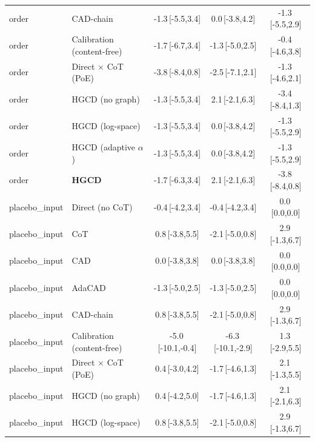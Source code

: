 \begin{tabular}{llccc}
order & CAD-chain & -1.3\,{\scriptsize[-5.5,3.4]} & 0.0\,{\scriptsize[-3.8,4.2]} & -1.3\,{\scriptsize[-5.5,2.9]} \\
order & Calibration (content-free) & -1.7\,{\scriptsize[-6.7,3.4]} & -1.3\,{\scriptsize[-5.0,2.5]} & -0.4\,{\scriptsize[-4.6,3.8]} \\
order & Direct $\times$ CoT (PoE) & -3.8\,{\scriptsize[-8.4,0.8]} & -2.5\,{\scriptsize[-7.1,2.1]} & -1.3\,{\scriptsize[-4.6,2.1]} \\
order & HGCD (no graph) & -1.3\,{\scriptsize[-5.5,3.4]} & 2.1\,{\scriptsize[-2.1,6.3]} & -3.4\,{\scriptsize[-8.4,1.3]} \\
order & HGCD (log-space) & -1.3\,{\scriptsize[-5.5,3.4]} & 0.0\,{\scriptsize[-3.8,4.2]} & -1.3\,{\scriptsize[-5.5,2.9]} \\
order & HGCD (adaptive $\alpha$) & -1.3\,{\scriptsize[-5.5,3.4]} & 0.0\,{\scriptsize[-3.8,4.2]} & -1.3\,{\scriptsize[-5.5,2.9]} \\
order & \textbf{HGCD} & -1.7\,{\scriptsize[-6.3,3.4]} & 2.1\,{\scriptsize[-2.1,6.3]} & -3.8\,{\scriptsize[-8.4,0.8]} \\
\midrule
placebo\_input & Direct (no CoT) & -0.4\,{\scriptsize[-4.2,3.4]} & -0.4\,{\scriptsize[-4.2,3.4]} & 0.0\,{\scriptsize[0.0,0.0]} \\
placebo\_input & CoT & 0.8\,{\scriptsize[-3.8,5.5]} & -2.1\,{\scriptsize[-5.0,0.8]} & 2.9\,{\scriptsize[-1.3,6.7]} \\
placebo\_input & CAD & 0.0\,{\scriptsize[-3.8,3.8]} & 0.0\,{\scriptsize[-3.8,3.8]} & 0.0\,{\scriptsize[0.0,0.0]} \\
placebo\_input & AdaCAD & -1.3\,{\scriptsize[-5.0,2.5]} & -1.3\,{\scriptsize[-5.0,2.5]} & 0.0\,{\scriptsize[0.0,0.0]} \\
placebo\_input & CAD-chain & 0.8\,{\scriptsize[-3.8,5.5]} & -2.1\,{\scriptsize[-5.0,0.8]} & 2.9\,{\scriptsize[-1.3,6.7]} \\
placebo\_input & Calibration (content-free) & -5.0\,{\scriptsize[-10.1,-0.4]} & -6.3\,{\scriptsize[-10.1,-2.9]} & 1.3\,{\scriptsize[-2.9,5.5]} \\
placebo\_input & Direct $\times$ CoT (PoE) & 0.4\,{\scriptsize[-3.0,4.2]} & -1.7\,{\scriptsize[-4.6,1.3]} & 2.1\,{\scriptsize[-1.3,5.5]} \\
placebo\_input & HGCD (no graph) & 0.4\,{\scriptsize[-4.2,5.0]} & -1.7\,{\scriptsize[-4.6,1.3]} & 2.1\,{\scriptsize[-2.1,6.3]} \\
placebo\_input & HGCD (log-space) & 0.8\,{\scriptsize[-3.8,5.5]} & -2.1\,{\scriptsize[-5.0,0.8]} & 2.9\,{\scriptsize[-1.3,6.7]} \\

\end{tabular}
